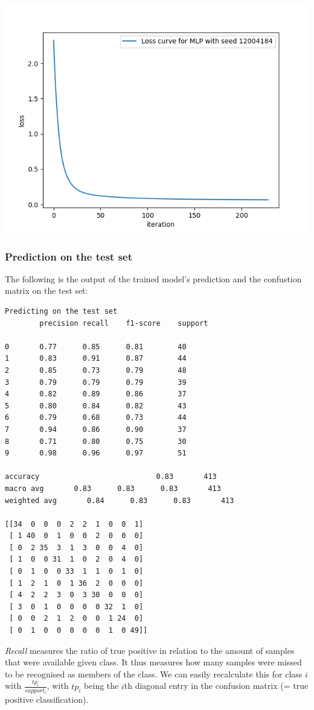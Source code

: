     \includegraphics[width=\textwidth]{code/plots/losscurve}

    \pagebreak
    \subsubsection{Prediction on the test set}
    The following is the output of the trained model's prediction and the confustion matrix on the test set:

    \begin{lstlisting}
Predicting on the test set
        precision recall    f1-score    support

0       0.77      0.85      0.81        40
1       0.83      0.91      0.87        44
2       0.85      0.73      0.79        48
3       0.79      0.79      0.79        39
4       0.82      0.89      0.86        37
5       0.80      0.84      0.82        43
6       0.79      0.68      0.73        44
7       0.94      0.86      0.90        37
8       0.71      0.80      0.75        30
9       0.98      0.96      0.97        51

accuracy                           0.83       413
macro avg       0.83      0.83      0.83       413
weighted avg       0.84      0.83      0.83       413

[[34  0  0  0  2  2  1  0  0  1]
 [ 1 40  0  1  0  0  2  0  0  0]
 [ 0  2 35  3  1  3  0  0  4  0]
 [ 1  0  0 31  1  0  2  0  4  0]
 [ 0  1  0  0 33  1  1  0  1  0]
 [ 1  2  1  0  1 36  2  0  0  0]
 [ 4  2  2  3  0  3 30  0  0  0]
 [ 3  0  1  0  0  0  0 32  1  0]
 [ 0  0  2  1  2  0  0  1 24  0]
 [ 0  1  0  0  0  0  0  1  0 49]]

    \end{lstlisting}
    \textit{Recall} measures the ratio of true positive in relation to the amount of samples that were available given class.
    It thus measures how many samples were missed to be recognised as members of the class.
    We can easily recalculate this for class $i$ with $\frac{tp_i}{support_i}$, with $tp_i$ being the $i$th diagonal entry in the confusion matrix (= true positive classification).



